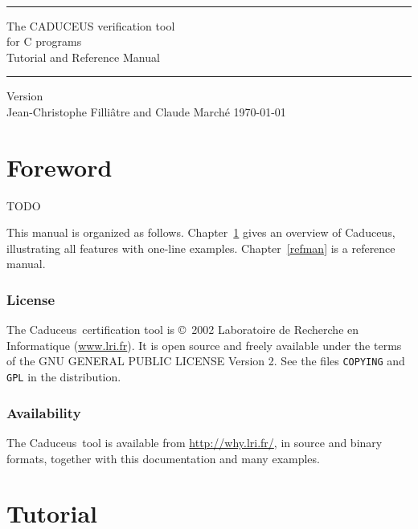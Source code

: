 \documentclass[a4paper,12pt]{report}
\newcommand{\caduceus}{\textsf{Caduceus}}
\begin{document}
\thispagestyle{empty}
\begin{center}
~\\[3cm]
\rule\textwidth{0.1cm}\\[0.5cm]
{\Huge\sf The CADUCEUS verification tool \\[0.5em] for C programs}\\[1cm]
{\Large\sf Tutorial and Reference Manual}\\[0.1cm]
\rule\textwidth{0.1cm}\\[1cm]
Version \caduceusversion\\[3cm]
Jean-Christophe Filli\^atre and Claude March\'e
\vfill
\today\\
\end{center}


\tableofcontents

\chapter*{Foreword}

TODO

\medskip

This manual is organized as follows. Chapter~\ref{tutorial} gives an
overview of \caduceus, illustrating all features with one-line examples.
Chapter~\ref{refman} is a reference manual.


\subsection*{License}

The \caduceus\ certification tool is \copyright\ 2002 Laboratoire de
Recherche en Informatique (\url{www.lri.fr}).
It is open source and freely available under the terms of the GNU
GENERAL PUBLIC LICENSE Version 2. See the files \texttt{COPYING} and
\texttt{GPL} in the distribution.


\subsection*{Availability}

The \caduceus\ tool is available from \url{http://why.lri.fr/}, in source
and binary formats, together with this documentation and many
examples.


\chapter{Tutorial}
\label{tutorial}
\end{document}
